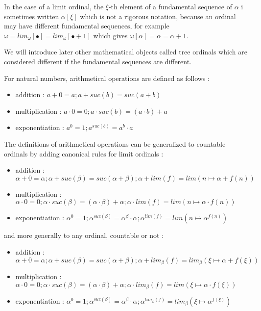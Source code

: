 \documentclass[10pt]{article}
\begin{document}
\bigskip

In the case of a limit ordinal, the \(\xi\)-th element of a fundamental sequence of \( \alpha \) i sometimes written \( \alpha[\xi] \) which is not a rigorous notation, because an ordinal may have different fundamental sequences, for example \( \omega = lim_\omega [\bullet] = lim_\omega [\bullet+1] \) which gives \( \omega[\alpha] = \alpha = \alpha+1 \).

We will introduce later other mathematical objects called tree ordinals which are considered different if the fundamental sequences are different.

\bigskip

For natural numbers, arithmetical operations are defined as follows :

\begin{itemize}
     \setlength{\itemsep}{1pt}
     \setlength{\parskip}{0pt}
     \setlength{\parsep}{0pt}
\item addition : \( a+0=a ; a+suc(b)=suc(a+b) \)
\item multiplication : \( a \cdot 0 = 0 ; a \cdot suc(b) = (a \cdot b) + a \)
\item exponentiation : \( a^0 = 1 ; a^{suc(b)} = a^b \cdot a  \)
\end{itemize}

The definitions of arithmetical operations can be generalized to countable ordinals by adding canonical rules for limit ordinals :

\begin{itemize}
     \setlength{\itemsep}{1pt}
     \setlength{\parskip}{0pt}
     \setlength{\parsep}{0pt}
\item addition : \( \alpha+0=\alpha ; \alpha+suc(\beta)=suc(\alpha+\beta); \alpha+lim(f)=lim(n \mapsto \alpha+f(n)) \)
\item multiplication : \( \alpha \cdot 0 = 0 ; \alpha \cdot suc(\beta) = (\alpha \cdot \beta) + \alpha ; \alpha \cdot lim(f) = lim (n \mapsto \alpha \cdot f(n)) \)
\item exponentiation : \( \alpha^0 = 1 ; \alpha^{suc(\beta)} = \alpha^\beta \cdot \alpha ; \alpha^{lim(f)} = lim (n \mapsto \alpha^{f(n)}) \)
\end{itemize}

and more generally to any ordinal, countable or not :

\begin{itemize}
     \setlength{\itemsep}{1pt}
     \setlength{\parskip}{0pt}
     \setlength{\parsep}{0pt}
\item addition : \( \alpha+0=\alpha ; \alpha+suc(\beta)=suc(\alpha+\beta); \alpha+lim_\beta(f)=lim_\beta(\xi \mapsto \alpha+f(\xi)) \)
\item multiplication : \( \alpha \cdot 0 = 0 ; \alpha \cdot suc(\beta) = (\alpha \cdot \beta) + \alpha ; \alpha \cdot lim_\beta(f) = lim (\xi \mapsto \alpha \cdot f(\xi)) \)
\item exponentiation : \( \alpha^0 = 1 ; \alpha^{suc(\beta)} = \alpha^\beta \cdot \alpha ; \alpha^{lim_\beta(f)} = lim_\beta (\xi \mapsto \alpha^{f(\xi)}) \)
\end{itemize}
\end{document}
